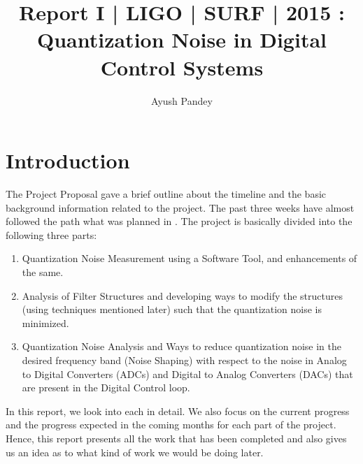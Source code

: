 \documentclass[colorlinks=true,pdfstartview=FitV,linkcolor=blue,
            citecolor=red,urlcolor=magenta]{ligodoc}
\title{Report I | LIGO | SURF | 2015 : Quantization Noise in Digital Control Systems}
\author{Ayush Pandey}
\begin{document}
\section{Introduction}

The Project Proposal\cite{ProjectProposal} gave a brief outline about the timeline and the basic background information related to the project. The past three weeks have almost followed the path what was planned in \cite{ProjectProposal}. The project is basically divided into the following three parts: \\
\begin{enumerate}
\item Quantization Noise Measurement using a Software Tool, and enhancements of the same.
\item Analysis of Filter Structures and developing ways to modify the structures (using techniques mentioned later) such that the quantization noise is minimized.
\item Quantization Noise Analysis and Ways to reduce quantization noise in the desired frequency band (Noise Shaping) with respect to the noise in Analog to Digital Converters (ADCs) and Digital to Analog Converters (DACs) that are present in the Digital Control loop.  

\end{enumerate}

In this report, we look into each in detail. We also focus on the current progress and the progress expected in the coming months for each part of the project. Hence, this report presents all the work that has been completed and also gives us an idea as to what kind of work we would be doing later.
\end{document}
